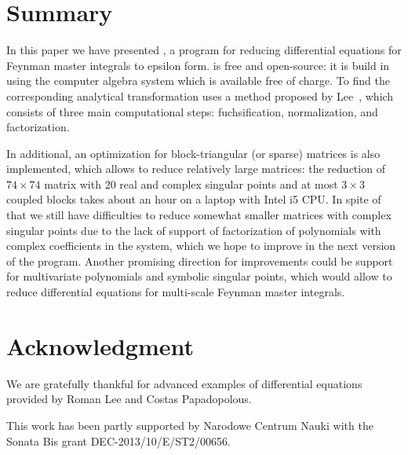 \documentclass[12pt,a4paper]{article}
\begin{document}
\section{Summary}
\label{sec:4}

In this paper we have presented \fuchsia, a program for reducing differential equations for Feynman master integrals to epsilon form.
\fuchsia is free and open-source: it is build in \python using the \maximasage computer algebra system which is available free of charge.
To find the corresponding analytical transformation \fuchsia uses a method proposed by Lee~\cite{Lee15}, which consists of three main computational steps: fuchsification, normalization, and factorization.

In additional, an optimization for block-triangular (or sparse) matrices is also implemented, which allows to reduce relatively large matrices: the reduction of ${74\times74}$ matrix with 20 real and complex singular points and at most $3\times3$ coupled blocks takes about an hour on a laptop with Intel i5 CPU.
In spite of that we still have difficulties to reduce somewhat smaller matrices with complex singular points due to the lack of support of factorization of polynomials with complex coefficients in the \maximasage system, which we hope to improve in the next version of the program.
Another promising direction for improvements could be support for multivariate polynomials and symbolic singular points, which would allow to reduce differential equations for multi-scale Feynman master integrals.

\section*{Acknowledgment}

We are gratefully thankful for advanced examples of differential equations provided by Roman Lee and Costas Papadopolous.

This work has been partly supported by Narodowe Centrum Nauki with the Sonata Bis grant DEC-2013/10/E/ST2/00656.


\end{document}
